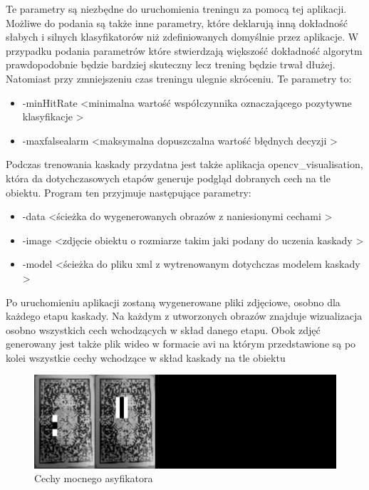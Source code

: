 \documentclass{article}
\numberwithin{equation}{section}
\begin{document}
Te parametry są niezbędne do uruchomienia treningu za pomocą tej aplikacji. Możliwe do podania są także inne parametry, które deklarują inną dokładność słabych i silnych klasyfikatorów niż zdefiniowanych domyślnie przez aplikacje. W przypadku podania parametrów które stwierdzają większość dokładność algorytm prawdopodobnie będzie bardziej skuteczny lecz trening będzie trwał dłużej. Natomiast przy zmniejszeniu czas treningu ulegnie skróceniu. Te parametry to:
 
\begin{itemize}
    \item -minHitRate \textless minimalna wartość współczynnika oznaczającego pozytywne klasyfikacje \textgreater
    \item -maxfalsealarm \textless maksymalna dopuszczalna wartość błędnych decyzji \textgreater

\end{itemize}

Podczas trenowania kaskady przydatna jest także aplikacja opencv\_visualisation, która da dotychczasowych etapów generuje podgląd dobranych cech na tle obiektu. Program ten przyjmuje następujące parametry:

\begin{itemize}
    \item -data \textless ścieżka do wygenerowanych obrazów z naniesionymi cechami \textgreater
    \item -image \textless zdjęcie obiektu o rozmiarze takim jaki podany do uczenia kaskady \textgreater
    \item -model  \textless ścieżka do pliku xml z wytrenowanym dotychczas modelem kaskady \textgreater

\end{itemize}

Po uruchomieniu aplikacji zostaną wygenerowane pliki zdjęciowe, osobno dla każdego etapu kaskady. Na każdym z utworzonych obrazów znajduje wizualizacja osobno wszystkich cech wchodzących w skład danego etapu. Obok zdjęć generowany jest także plik wideo w formacie avi na którym przedstawione są po kolei wszystkie cechy wchodzące w skład kaskady na tle obiektu

\begin{figure}[H]
\centering
\includegraphics[scale=0.1]{data3stage_1.png}
\caption{Cechy mocnego asyfikatora}
\end{figure}
\end{document}
